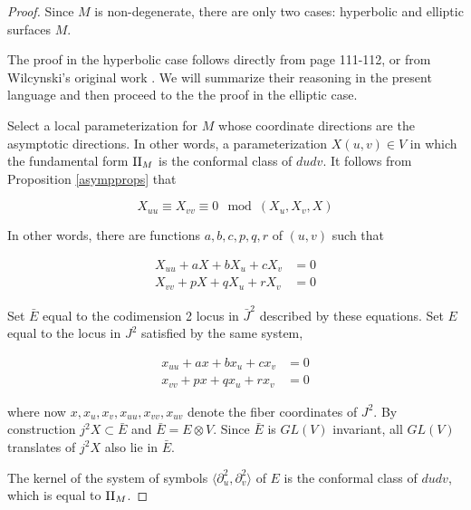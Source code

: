 \documentclass[11pt]{article}
\numberwithin{equation}{section}
\theoremstyle{plain}
\theoremstyle{remark}
\newcommand{\D}{\partial}
\newcommand{\GL}{GL}
\newcommand{\II}{\textnormal{II}}
\begin{document}
\begin{proof} Since $M$ is non-degenerate, there are only two cases: hyperbolic and elliptic surfaces $M$.

The proof in the hyperbolic case follows directly from \cite{to} page 111-112, or from Wilcynski's original work \cite{wil}. We will summarize their reasoning in the present language and then proceed to the the proof in the elliptic case.

Select a local parameterization for $M$ whose coordinate directions are the asymptotic directions. In other words, a parameterization $X(u,v)\in V$ in which the fundamental form $\II_M$ is the conformal class of $dudv$. It follows from Proposition \ref{asympprops} that

\[ X_{uu} \equiv X_{vv}\equiv 0 \mod (X_{u},X_{v},X)\]

In other words, there are functions $a,b,c,p,q,r$ of $(u,v)$ such that

\begin{align*}
X_{uu} + a X + b X_u + c X_v &=0 \\
X_{vv} + p X + q X_u + r X_v &=0
\end{align*}

Set $\bar{E}$ equal to the codimension 2 locus in $\bar{J}^{2}$ described by these equations. Set $E$ equal to the locus in $J^{2}$ satisfied by the same system,

\begin{equation}\label{hyperbolicreduction}
\begin{split}
x_{uu} + a x + b x_u + c x_v &=0 \\
x_{vv} + p x + q x_u + r x_v &=0
\end{split}
\end{equation}

where now $x,x_u,x_v,x_{uu},x_{vv},x_{uv}$ denote the fiber coordinates of $J^{2}$. By construction $j^{2}X\subset \bar{E}$ and $\bar{E}=E\otimes V$. Since $\bar{E}$ is $\GL(V)$ invariant, all $\GL(V)$ translates of $j^{2}X$ also lie in $\bar{E}$.

The kernel of the system of symbols $\langle \D_{u}^{2},\D_{v}^{2}\rangle$ of $E$ is the conformal class of $dudv$, which is equal to $\II_M$.




\end{proof}
\end{document}
